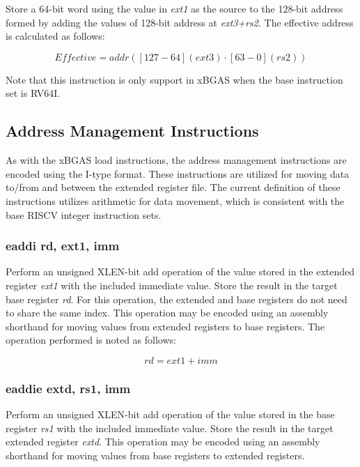 \documentclass{article}
\begin{document}
Store a 64-bit word using the value in \textit{ext1} as the source 
to the 128-bit address formed by adding the values of
128-bit address at \textit{ext3+rs2}.  The effective address is calculated 
as follows: 

\begin{equation}
Effective = addr([127-64](ext3) \cdot [63-0](rs2))
\end{equation}

\begin{commentary}
Note that this instruction is only support in xBGAS when the base 
instruction set is RV64I.
\end{commentary}

\subsection{Address Management Instructions}
\label{sec:AddressManagementInstructions}

As with the xBGAS load instructions, the address management instructions 
are encoded using the I-type format.  These instructions are utilized for 
moving data to/from and between the extended register file.  The current 
definition of these instructions utilizes arithmetic for data movement, 
which is consistent with the base RISCV integer instruction sets.

\subsubsection{eaddi rd, ext1, imm}

Perform an unsigned XLEN-bit add operation of the value stored in the extended 
register \textit{ext1} with the included immediate value.  Store the result 
in the target base register \textit{rd}.  For this operation, the extended and base registers 
do not need to share the same index.  This operation may be encoded 
using an assembly shorthand for moving values from extended registers 
to base registers.  The operation performed is noted as follows:

\begin{equation}
rd = ext1 + imm
\end{equation}

\subsubsection{eaddie extd, rs1, imm}

Perform an unsigned XLEN-bit add operation of the value stored in the base 
register \textit{rs1} with the included immediate value.  Store the result in the 
target extended register \textit{extd}.  This operation may be encoded 
using an assembly shorthand for moving values from base registers 
to extended registers.
\end{document}
